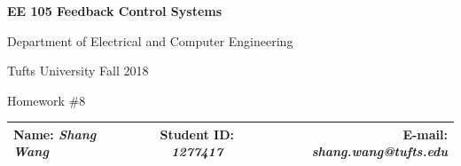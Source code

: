 \documentclass[a4paper]{article}
\begin{document}
\begin{center}
\bf\Large
EE 105 Feedback Control Systems\par
Department of Electrical and Computer Engineering\par
Tufts University Fall 2018\par
Homework \#8\par   
\end{center}
\begin{table}[H]
\begin{center}
\begin{tabular*}{\textwidth}{@{\extracolsep{\fill}}lcr}
Name: {\it Shang Wang} &Student ID: {\it 1277417} &E-mail: {\it shang.wang@tufts.edu}\\
\hline
\end{tabular*}
\end{center}
\end{table}
\end{document}
